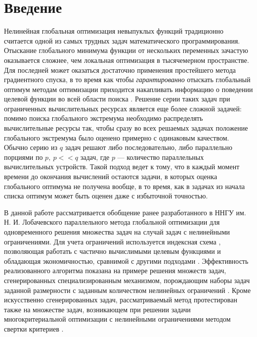 \documentclass[11pt, oneside, a4paper]{article}
\begin{document}
\section{Введение}

Нелинейная глобальная оптимизация невыпуклых функций традиционно считается одной из самых трудных
задач математического программирования. Отыскание глобального минимума функции от нескольких переменных
зачастую оказывается сложнее, чем локальная оптимизация в тысячемерном пространстве. Для последней может оказаться достаточно
применения простейшего метода градиентного спуска, в то время как чтобы \textit{гарантированно} отыскать глобальный оптимум методам
оптимизации приходится накапливать информацию о поведении целевой функции во всей области поиска \cite{Jones2009,Paulavicius2011,Evtushenko2013,Strongin2000}. Решение серии таких задач при ограниченных вычислительных
ресурсах является еще более сложной задачей: помимо поиска глобального экстремума необходимо
распределять вычислительные ресурсы так, чтобы сразу во всех решаемых задачах положение глобального
экстремума было оценено примерно с одинаковым качеством. Обычно серию из \(q\) задач решают либо последовательно, либо
параллельно порциями по \(p,\:p<<q\) задач, где \(p\) --- количество параллельных вычислительных устройств.
Такой подход ведет к тому, что в каждый момент времени до окончания вычислений
остаются задачи, в которых оценка глобального оптимума не получена вообще, в то время, как в задачах из начала
списка оптимум может быть оценен даже с избыточной точностью.

В данной работе рассматривается обобщение ранее разработанного в ННГУ им. Н. И. Лобачевского
параллельного метода глобальной оптимизации для одновременного решения множества задач \cite{BarkalovStrongin2018} на
случай задач с нелинейными ограничениями. Для учета ограничений используется индексная схема \cite{Strongin2000},
позволяющая работать с частично вычислимыми целевым функциями и обладающая экономичностью,
сравнимой с другими подходами \cite{BarkalovLebedev2017}. Эффективность реализованного
алгоритма показана на примере решения множеств задач, сгенерированных специализированным
механизмом, порождающим наборы задач заданной размерности с заданным количеством нелинейных ограничений \cite{GergelBarkalov2019}.
Кроме искусственно сгенерированных задач, рассматриваемый метод протестирован также
на множестве задач, возникающем при решении задачи многокритериальной оптимизации
с нелинейными ограничениями методом свертки критериев \cite{Ehrgott2005}.
\end{document}
